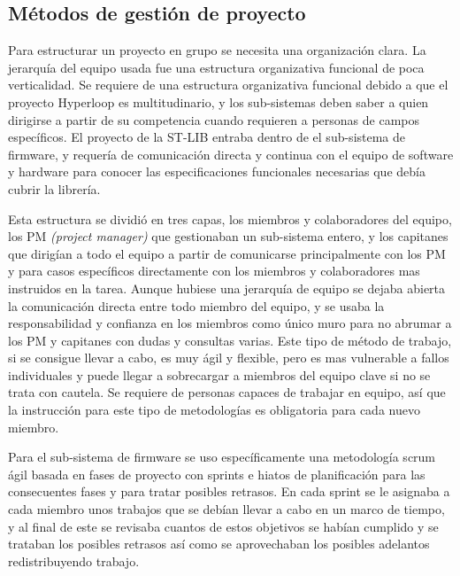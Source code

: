 \documentclass{report}
\begin{document}
\subsection{Métodos de gestión de proyecto}
Para estructurar un proyecto en grupo se necesita una organización clara. La jerarquía del equipo usada fue una estructura organizativa funcional de poca verticalidad. Se requiere de una estructura organizativa funcional debido a que el proyecto Hyperloop es multitudinario, y los sub-sistemas deben saber a quien dirigirse a partir de su competencia cuando requieren a personas de campos específicos. El proyecto de la ST-LIB entraba dentro de el sub-sistema de firmware, y requería de comunicación directa y continua con el equipo de software y hardware para conocer las especificaciones funcionales necesarias que debía cubrir la librería. \par\vspace{0.3 cm}
Esta estructura se dividió en tres capas, los miembros y colaboradores del equipo, los PM \textit{(project manager)} que gestionaban un sub-sistema entero, y los capitanes que dirigían a todo el equipo a partir de comunicarse principalmente con los PM y para casos específicos directamente con los miembros y colaboradores mas instruidos en la tarea. Aunque hubiese una jerarquía de equipo se dejaba abierta la comunicación directa entre todo miembro del equipo, y se usaba la responsabilidad y confianza en los miembros como único muro para no abrumar a los PM y capitanes con dudas y consultas varias. Este tipo de método de trabajo, si se consigue llevar a cabo, es muy ágil y flexible, pero es mas vulnerable a fallos individuales y puede llegar a sobrecargar a miembros del equipo clave si no se trata con cautela. Se requiere de personas capaces de trabajar en equipo, así que la instrucción para este tipo de metodologías es obligatoria para cada nuevo miembro. 
\par \vspace{0.3 cm}
Para el sub-sistema de firmware se uso específicamente una metodología scrum ágil basada en fases de proyecto con sprints e hiatos de planificación para las consecuentes fases y para tratar posibles retrasos. En cada sprint se le asignaba a cada miembro unos trabajos que se debían llevar a cabo en un marco de tiempo, y al final de este se revisaba cuantos de estos objetivos se habían cumplido y se trataban los posibles retrasos así como se aprovechaban los posibles adelantos redistribuyendo trabajo. \par \vspace{0.3 cm}
\end{document}
